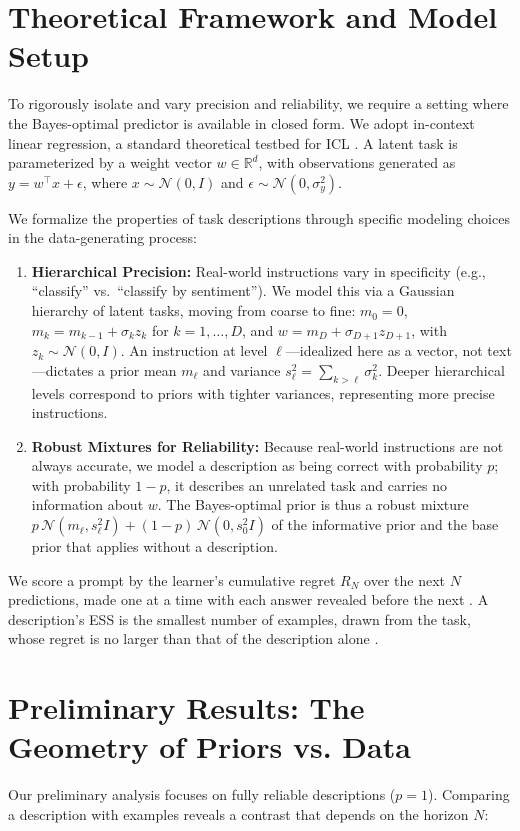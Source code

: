 \documentclass[10pt,letterpaper]{article}
\begin{document}
\section{Theoretical Framework and Model Setup}
To rigorously isolate and vary precision and reliability, we require a setting where the Bayes-optimal predictor is available in closed form. We adopt in-context linear regression, a standard theoretical testbed for ICL \citep{garg2022,akyurek2023}. A latent task is parameterized by a weight vector $w \in \mathbb{R}^d$, with observations generated as $y = w^\top x + \epsilon$, where $x \sim \mathcal{N}(0, I)$ and $\epsilon \sim \mathcal{N}(0, \sigma_y^2)$.

We formalize the properties of task descriptions through specific modeling choices in the data-generating process:
\begin{enumerate}
\item \textbf{Hierarchical Precision:} Real-world instructions vary in specificity (e.g., ``classify'' vs.\ ``classify by sentiment''). We model this via a Gaussian hierarchy of latent tasks, moving from coarse to fine: $m_0 = 0$, $m_k = m_{k-1} + \sigma_k z_k$ for $k = 1, \dots, D$, and $w = m_D + \sigma_{D+1} z_{D+1}$, with $z_k \sim \mathcal{N}(0, I)$. An instruction at level $\ell$---idealized here as a vector, not text---dictates a prior mean $m_\ell$ and variance $s_\ell^2 = \sum_{k>\ell} \sigma_k^2$. Deeper hierarchical levels correspond to priors with tighter variances, representing more precise instructions.
\item \textbf{Robust Mixtures for Reliability:} Because real-world instructions are not always accurate, we model a description as being correct with probability $p$; with probability $1-p$, it describes an unrelated task and carries no information about $w$. The Bayes-optimal prior is thus a robust mixture \citep{schmidli2014} $p\,\mathcal{N}(m_\ell, s_\ell^2 I) + {(1-p)}\,\mathcal{N}(0, s_0^2 I)$ of the informative prior and the base prior that applies without a description.
\end{enumerate}

We score a prompt by the learner's cumulative regret $R_N$ over the next $N$ predictions, made one at a time with each answer revealed before the next \citep{genewein2025}. A description's ESS is the smallest number of examples, drawn from the task, whose regret is no larger than that of the description alone \citep{reimherr2021}.

\section{Preliminary Results: The Geometry of Priors vs. Data}
Our preliminary analysis focuses on fully reliable descriptions ($p=1$). Comparing a description with examples reveals a contrast that depends on the horizon $N$:
\end{document}

